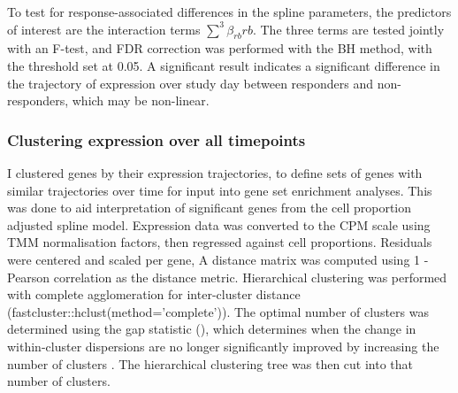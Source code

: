 To test for response-associated differences in the spline parameters, 
the predictors of interest are the interaction terms $\sum_{}^{3}{\beta_{rb} rb}$. 
The three terms are tested jointly with an F-test, and \gls{FDR} correction was performed with the \gls{BH} method, with the threshold set at 0.05.
A significant result indicates a significant difference in the trajectory of expression over study day between responders and non-responders, which may be non-linear.

\subsubsection{Clustering expression over all timepoints}

I clustered genes by their expression trajectories,
to define sets of genes with similar trajectories over time for input into gene set enrichment analyses.
This was done to aid interpretation of significant genes from the cell proportion adjusted spline model.
Expression data was converted to the \gls{CPM} scale using \gls{TMM} normalisation factors, then regressed against cell proportions.
Residuals were centered and scaled per gene, 
A distance matrix was computed using 1 - Pearson correlation as the distance metric.
Hierarchical clustering was performed with complete agglomeration for inter-cluster distance (fastcluster::hclust(method='complete')).
The optimal number of clusters was determined using the gap statistic (),
which determines when the change in within-cluster dispersions are no longer significantly improved by increasing the number of clusters \autocite{tibshirani2001EstimatingNumberClusters}.
The hierarchical clustering tree was then cut into that number of clusters.


